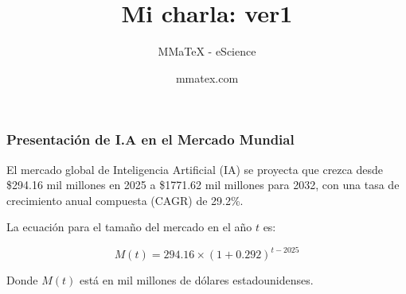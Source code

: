 \documentclass{beamer}
\title{Mi charla: ver1}
\subtitle{MMaTeX - eScience}
\author{mmatex.com}
\begin{document}
\maketitle






\begin{frame}

\frametitle{Presentaci\'on de I.A en el Mercado Mundial}

El mercado global de Inteligencia Artificial (IA) se proyecta que 
crezca desde \$294.16 mil millones en 2025 a \$1771.62 mil 
millones para 2032, con una tasa de crecimiento anual compuesta (CAGR) de 29.2\%.

La ecuaci\'on para el tama\~no del mercado en el a\~no \( t \) es:

\[ M(t) = 294.16 \times (1 + 0.292)^{t - 2025} \]

Donde \( M(t) \) est\'a en mil millones de d\'olares estadounidenses.


\end{frame}
\end{document}
